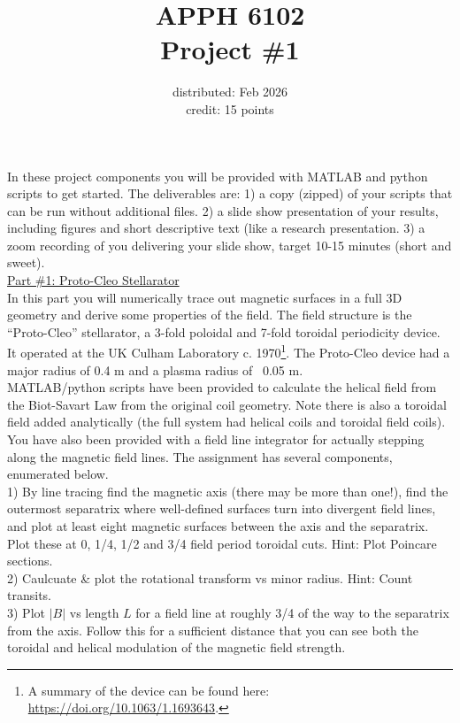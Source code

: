\documentclass[letterpaper,12pt]{article}
\title{\vspace{-0.5 in} APPH 6102\\ Project \#1 \vspace{-0.5 in}}
\date{distributed: Feb 2026 \\ credit: 15 points}
\begin{document}
\maketitle
\vspace{-25 pt}
In these project components you will be provided with MATLAB and python scripts to get started. The deliverables are: 1) a copy (zipped) of your scripts that can be run without additional files. 2) a slide show presentation of your results, including figures and short descriptive text (like a research presentation. 3) a zoom recording of you delivering your slide show, target 10-15 minutes (short and sweet).\\

\underline{Part \#1: Proto-Cleo Stellarator}\\

In this part you will numerically trace out magnetic surfaces in a full 3D geometry and derive some properties of the field. The field structure is the “Proto-Cleo” stellarator, a 3-fold poloidal and 7-fold toroidal periodicity device. It operated at the UK Culham Laboratory c. 1970\footnote{A summary of the device can be found here: \url{https://doi.org/10.1063/1.1693643}.}. The Proto-Cleo device had a major radius of 0.4 m and a plasma radius of ~0.05 m.\\

MATLAB/python scripts have been provided to calculate the helical field from the Biot-Savart Law from the original coil geometry. Note there is also a toroidal field added analytically (the full system had helical coils and toroidal field coils). You have also been provided with a field line integrator for actually stepping along the magnetic field lines. The assignment has several components, enumerated below.\\

1) By line tracing find the magnetic axis (there may be more than one!), find the outermost separatrix where well-defined surfaces turn into divergent field lines, and plot at least eight magnetic surfaces between the axis and the separatrix. Plot these at 0, 1/4, 1/2 and 3/4 field period toroidal cuts. Hint: Plot Poincare sections.\\

2) Caulcuate \& plot the rotational transform vs minor radius. Hint: Count transits.\\

3) Plot $\left|B\right|$ vs length $L$ for a field line at roughly 3/4 of the way to the separatrix from the axis. Follow this for a sufficient distance that you can see both the toroidal and helical modulation of the magnetic field strength.\\
\end{document}
